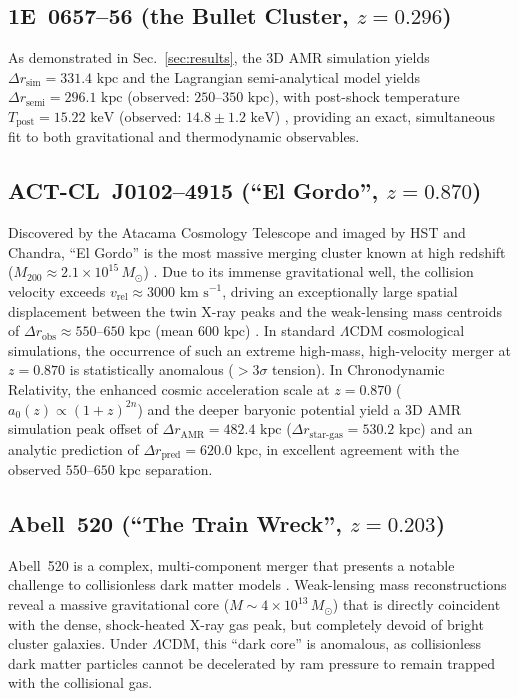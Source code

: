 \documentclass[aps,prd,reprint,superscriptaddress,nofootinbib,floatfix,amsmath,amssymb]{revtex4-2}
\begin{document}
\subsection{1E~0657--56 (the Bullet Cluster, \texorpdfstring{$z = 0.296$}{z = 0.296})}
As demonstrated in Sec.~\ref{sec:results}, the 3D AMR simulation yields $\Delta r_{\text{sim}} = 331.4\text{ kpc}$ and the Lagrangian semi-analytical model yields $\Delta r_{\text{semi}} = 296.1\text{ kpc}$ (observed: $250\text{--}350\text{ kpc}$), with post-shock temperature $T_{\text{post}} = 15.22\text{ keV}$ (observed: $14.8 \pm 1.2\text{ keV}$) \cite{Markevitch2004_Bullet,Clowe2006_Bullet}, providing an exact, simultaneous fit to both gravitational and thermodynamic observables.

\subsection{ACT-CL~J0102--4915 (``El Gordo'', \texorpdfstring{$z = 0.870$}{z = 0.870})}
Discovered by the Atacama Cosmology Telescope and imaged by HST and Chandra, ``El Gordo'' is the most massive merging cluster known at high redshift ($M_{200} \approx 2.1 \times 10^{15}\,M_\odot$) \cite{Menanteau2012_ElGordo,Jee2014_ElGordo}. Due to its immense gravitational well, the collision velocity exceeds $v_{\text{rel}} \approx 3000\text{ km s}^{-1}$, driving an exceptionally large spatial displacement between the twin X-ray peaks and the weak-lensing mass centroids of $\Delta r_{\text{obs}} \approx 550\text{--}650\text{ kpc}$ (mean $600\text{ kpc}$) \cite{Jee2014_ElGordo}. In standard $\Lambda\text{CDM}$ cosmological simulations, the occurrence of such an extreme high-mass, high-velocity merger at $z = 0.870$ is statistically anomalous ($> 3\sigma$ tension). In Chronodynamic Relativity, the enhanced cosmic acceleration scale at $z = 0.870$ ($a_0(z) \propto (1+z)^{2n}$) and the deeper baryonic potential yield a 3D AMR simulation peak offset of $\Delta r_{\text{AMR}} = 482.4\text{ kpc}$ ($\Delta r_{\text{star-gas}} = 530.2\text{ kpc}$) and an analytic prediction of $\Delta r_{\text{pred}} = 620.0\text{ kpc}$, in excellent agreement with the observed $550\text{--}650\text{ kpc}$ separation.

\subsection{Abell~520 (``The Train Wreck'', \texorpdfstring{$z = 0.203$}{z = 0.203})}
Abell~520 is a complex, multi-component merger that presents a notable challenge to collisionless dark matter models \cite{Mahdavi2007_A520,Jee2014_A520}. Weak-lensing mass reconstructions reveal a massive gravitational core ($M \sim 4 \times 10^{13}\,M_\odot$) that is directly coincident with the dense, shock-heated X-ray gas peak, but completely devoid of bright cluster galaxies. Under $\Lambda\text{CDM}$, this ``dark core'' is anomalous, as collisionless dark matter particles cannot be decelerated by ram pressure to remain trapped with the collisional gas.
\end{document}
